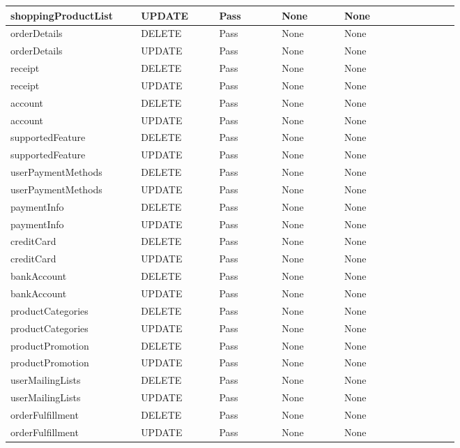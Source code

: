\begin{spacing}{1.25}
\begin{longtable}{ | p{0.25\linewidth} | p{0.15\linewidth} | p{0.126\linewidth} | p{0.128\linewidth} | p{0.22\linewidth} | }
shoppingProductList			&	UPDATE		&	Pass		&	None							&	None				\\\hline
orderDetails				&	DELETE		&	Pass		&	None							&	None				\\\hline
orderDetails				&	UPDATE		&	Pass		&	None							&	None				\\\hline
receipt						&	DELETE		&	Pass		&	None							&	None				\\\hline
receipt						&	UPDATE		&	Pass		&	None							&	None				\\\hline
account						&	DELETE		&	Pass		&	None							&	None				\\\hline
account						&	UPDATE		&	Pass		&	None							&	None				\\\hline
supportedFeature			&	DELETE		&	Pass		&	None							&	None				\\\hline
supportedFeature			&	UPDATE		&	Pass		&	None							&	None				\\\hline
userPaymentMethods			&	DELETE		&	Pass		&	None							&	None				\\\hline
userPaymentMethods			&	UPDATE		&	Pass		&	None							&	None				\\\hline
paymentInfo					&	DELETE		&	Pass		&	None							&	None				\\\hline
paymentInfo					&	UPDATE		&	Pass		&	None							&	None				\\\hline
creditCard					&	DELETE		&	Pass		&	None							&	None				\\\hline
creditCard					&	UPDATE		&	Pass		&	None							&	None				\\\hline
bankAccount					&	DELETE		&	Pass		&	None							&	None				\\\hline
bankAccount					&	UPDATE		&	Pass		&	None							&	None				\\\hline
productCategories			&	DELETE		&	Pass		&	None							&	None				\\\hline
productCategories			&	UPDATE		&	Pass		&	None							&	None				\\\hline
productPromotion			&	DELETE		&	Pass		&	None							&	None				\\\hline
productPromotion			&	UPDATE		&	Pass		&	None							&	None				\\\hline
userMailingLists			&	DELETE		&	Pass		&	None							&	None				\\\hline
userMailingLists			&	UPDATE		&	Pass		&	None							&	None				\\\hline
orderFulfillment			&	DELETE		&	Pass		&	None							&	None				\\\hline
orderFulfillment			&	UPDATE		&	Pass		&	None							&	None				\\\hline

\end{longtable}
\end{spacing}
